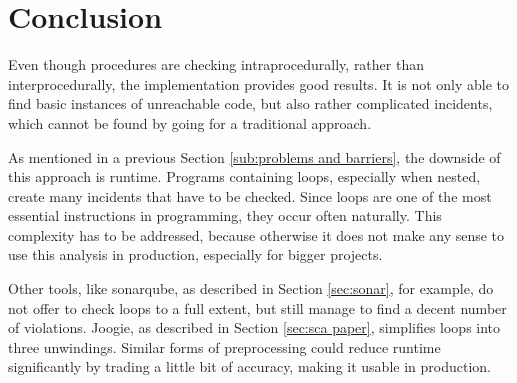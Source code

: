 
\chapter{Conclusion}
\label{cha:conclusion}

Even though procedures are checking intraprocedurally, rather than interprocedurally, the implementation provides good results. It is not only able to find basic instances of unreachable code, but also rather complicated incidents, which cannot be found by going for a traditional approach.


As mentioned in a previous Section \ref{sub:problems and barriers}, the downside of this approach is runtime. Programs containing loops, especially when nested, create many incidents that have to be checked. Since loops are one of the most essential instructions in programming, they occur often naturally. 
This complexity has to be addressed, because otherwise it does not make any sense to use this analysis in production, especially for bigger projects.


Other tools, like sonarqube, as described in Section \ref{sec:sonar}, for example, do not offer to check loops to a full extent, but still manage to find a decent number of violations. Joogie, as described in Section \ref{sec:sca paper}, simplifies loops into three unwindings. Similar forms of preprocessing could reduce runtime significantly by trading a little bit of accuracy, making it usable in production. 
